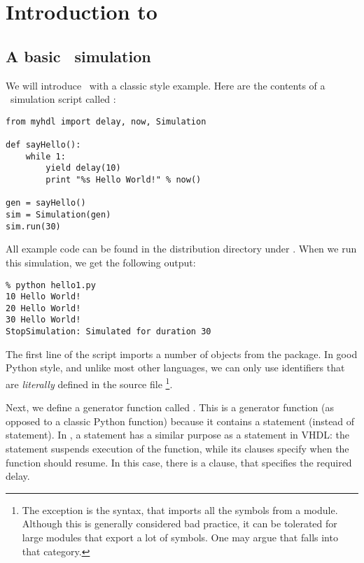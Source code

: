 \chapter{Introduction to \myhdl\ \label{intro}}

\section{A basic \myhdl\ simulation \label{intro-basic}}

We will introduce \myhdl\ with a classic  style
example. Here are the contents of a \myhdl\ simulation script called
:

\begin{verbatim}
from myhdl import delay, now, Simulation

def sayHello():
    while 1:
        yield delay(10)
        print "%s Hello World!" % now()

gen = sayHello()
sim = Simulation(gen)
sim.run(30)
\end{verbatim}

All example code can be found in the distribution directory under
.  When we run this simulation, we get the
following output:

\begin{verbatim}
% python hello1.py
10 Hello World!
20 Hello World!
30 Hello World!
StopSimulation: Simulated for duration 30
\end{verbatim}

The first line of the script imports a number of objects from the
 package. In good Python style, and unlike most other
languages, we can only use identifiers that are
\emph{literally} defined in the source file 
\footnote{The exception is the  syntax,
that imports all the symbols from a module. Although this is generally
considered bad practice, it can be tolerated for large modules that
export a lot of symbols. One may argue that
 falls into that category.}.

Next, we define a generator function called
. This is a generator function (as opposed to
a classic Python function) because it contains a 
statement (instead of  statement). In \myhdl{}, a
 statement has a similar purpose as a 
statement in VHDL: the statement suspends execution of the function,
while its clauses specify when the function should resume. In this case,
there is a  clause, that specifies the required delay.

